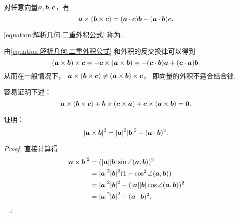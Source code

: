 \begin{theorem}
对任意向量\(\boldsymbol{a},\boldsymbol{b},\boldsymbol{c}\)，有
\begin{equation}\label{equation:解析几何.二重外积公式}
	\boldsymbol{a}\times(\boldsymbol{b}\times\boldsymbol{c})
	= (\boldsymbol{a}\cdot\boldsymbol{c}) \boldsymbol{b}
	- (\boldsymbol{a}\cdot\boldsymbol{b}) \boldsymbol{c}.
\end{equation}
\end{theorem}
\cref{equation:解析几何.二重外积公式}
称为.

由\cref{equation:解析几何.二重外积公式}
和外积的反交换律可以得到\begin{equation*}
	(\boldsymbol{a}\times\boldsymbol{b})\times\boldsymbol{c}
	= -\boldsymbol{c}\times(\boldsymbol{a}\times\boldsymbol{b})
	= -(\boldsymbol{c}\cdot\boldsymbol{b}) \boldsymbol{a}
	+ (\boldsymbol{c}\cdot\boldsymbol{a}) \boldsymbol{b}.
\end{equation*}
从而在一般情况下，
\(\boldsymbol{a}\times(\boldsymbol{b}\times\boldsymbol{c})
\neq
(\boldsymbol{a}\times\boldsymbol{b})\times\boldsymbol{c}\)，
即向量的外积不适合结合律.

容易证明下述：
\begin{equation}\label{equation:解析几何.雅克比等式}
	\boldsymbol{a}\times(\boldsymbol{b}\times\boldsymbol{c})
	+ \boldsymbol{b}\times(\boldsymbol{c}\times\boldsymbol{a})
	+ \boldsymbol{c}\times(\boldsymbol{a}\times\boldsymbol{b})
	= \boldsymbol{0}.
\end{equation}

\begin{example}
证明：\begin{equation*}
	\abs{\boldsymbol{a}\times\boldsymbol{b}}^2
	= \abs{\boldsymbol{a}}^2 \abs{\boldsymbol{b}}^2 - (\boldsymbol{a}\cdot\boldsymbol{b})^2.
\end{equation*}
\begin{proof}
\def\t{\angle(\vb{a},\vb{b})}%
直接计算得\begin{align*}
	\abs{\VectorOuterProduct{\vb{a}}{\vb{b}}}^2
	&= (\VectorLengthA{\vb{a}}\VectorLengthA{\vb{b}}\sin\t)^2 \\
	&= \VectorLengthA{\vb{a}}^2 \VectorLengthA{\vb{b}}^2 (1-\cos^2\t) \\
	&= \VectorLengthA{\vb{a}}^2 \VectorLengthA{\vb{b}}^2
	- (\VectorLengthA{\vb{a}}\VectorLengthA{\vb{b}}\cos\t)^2 \\
	&= \VectorLengthA{\vb{a}}^2 \VectorLengthA{\vb{b}}^2
	- (\VectorInnerProductDot{\vb{a}}{\vb{b}})^2.
	\qedhere
\end{align*}
\end{proof}
\end{example}

